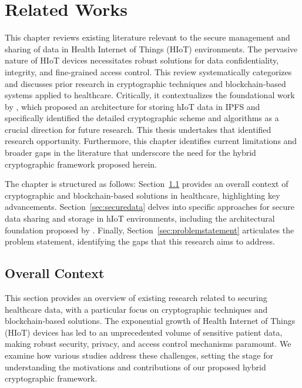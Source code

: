 \documentclass[cic,tc,english]{iiufrgs}
\begin{document}
\chapter{Related Works}
    \label{chap:relatedworks}

    This chapter reviews existing literature relevant to the secure management and sharing of data in Health Internet of Things (HIoT) environments. The pervasive nature of HIoT devices necessitates robust solutions for data confidentiality, integrity, and fine-grained access control. This review systematically categorizes and discusses prior research in cryptographic techniques and blockchain-based systems applied to healthcare. Critically, it contextualizes the foundational work by \citet{laura2023}, which proposed an architecture for storing hIoT data in IPFS and specifically identified the detailed cryptographic scheme and algorithms as a crucial direction for future research. This thesis undertakes that identified research opportunity. Furthermore, this chapter identifies current limitations and broader gaps in the literature that underscore the need for the hybrid cryptographic framework proposed herein.

    The chapter is structured as follows: Section~\ref{sec:overallcontext} provides an overall context of cryptographic and blockchain-based solutions in healthcare, highlighting key advancements. Section~\ref{sec:securedata} delves into specific approaches for secure data sharing and storage in hIoT environments, including the architectural foundation proposed by \citet{laura2023}. Finally, Section~\ref{sec:problemstatement} articulates the problem statement, identifying the gaps that this research aims to address.




    \section{Overall Context}
    \label{sec:overallcontext}

        This section provides an overview of existing research related to securing healthcare data, with a particular focus on cryptographic techniques and blockchain-based solutions. The exponential growth of Health Internet of Things (HIoT) devices has led to an unprecedented volume of sensitive patient data, making robust security, privacy, and access control mechanisms paramount. We examine how various studies address these challenges, setting the stage for understanding the motivations and contributions of our proposed hybrid cryptographic framework.
\end{document}

